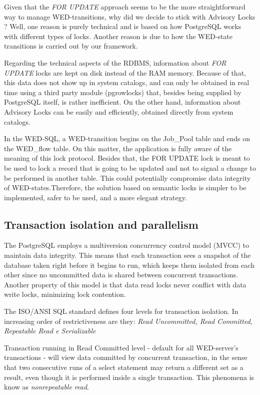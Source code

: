 \documentclass[12pt]{article}
\begin{document}
Given that the \emph{FOR UPDATE} approach seems to be the more straightforward way to manage WED-transitions, why did we decide to stick with Advisory Locks ? Well, one reason is purely technical and is based on how PostgreSQL works with different types of locks. Another reason is due to how the WED-state transitions is carried out by our framework. 

Regarding the technical aspects of the RDBMS, information about \emph{FOR UPDATE} locks are kept on disk instead of the RAM memory. Because of that, this data does not show up in system catalogs, and can only be obtained in real time using a third party module (pgrowlocks) that, besides being supplied by PostgreSQL itself, is rather inefficient. On the
other hand, information about Advisory Locks can be easily and efficiently, obtained directly from system catalogs.  

In the WED-SQL, a WED-transition begins on the Job\_Pool table and ends on the WED\_flow table. On this matter, the application is fully aware of the meaning of this lock protocol. Besides that, the FOR UPDATE lock is meant 
to be used to lock a record that is going to be updated and not to signal a change to be performed in another table. This could potentially compromise
data integrity of WED-states.Therefore, the solution based on semantic locks is simpler to be implemented, safer to be used, and a more elegant strategy.

\subsection{Transaction isolation and parallelism }

The PostgreSQL employs a multiversion concurrency control model (MVCC) to maintain data integrity. This means that each transaction sees a snapshot of the database taken right before it begins to run, which keeps them isolated from each other since no uncommitted 
data is shared between concurrent transactions. Another property of this model is that data read locks never conflict with data write locks, minimizing lock contention.

The ISO/ANSI SQL standard defines four levels for transaction isolation. In increasing order of restrictiveness are they:  \emph{Read Uncommitted, Read Committed, Repeatable Read e Serializable}

Transaction running in Read Committed level - default for all WED-server’s transactions - will view data committed by concurrent transaction, in the sense that two consecutive runs of a select statement may return a different set as a result, even though it is performed inside a  single transaction. This phenomena is know as \emph{nonrepeatable read}.
 
\end{document}
